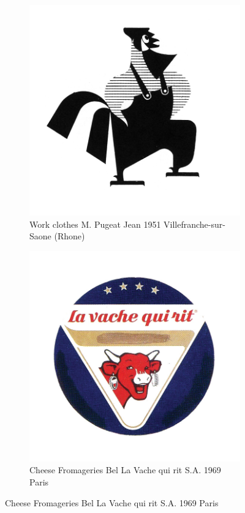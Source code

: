 \begin{figure}[h]
  \begin{subfigure}{.45\textwidth}
    \centering
    \includegraphics[width=.5\linewidth]{images/supplement/trademarks/french/10_51}
    \caption[]{Work clothes M. Pugeat Jean 1951 Villefranche-sur-Saone (Rhone)}
    \label{fig:trademarks:french:10.51}
  \end{subfigure}\hfill
  \begin{subfigure}{.45\textwidth}
    \centering
    \includegraphics[width=.5\linewidth]{images/supplement/trademarks/french/10_90}
    \caption[]{Cheese Fromageries Bel La Vache qui rit S.A. 1969 Paris}
    \label{fig:trademarks:french:10.90}
  \end{subfigure}
\end{figure}

\clearpage

